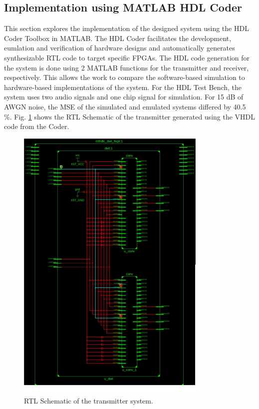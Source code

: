 \documentclass[conference]{IEEEtran}
\begin{document}
\subsection{Implementation using MATLAB HDL Coder}
This section explores the implementation of the designed system using the HDL Coder Toolbox in MATLAB. The HDL Coder facilitates the development, eumlation and verification of hardware designs and automatically generates synthesizable RTL code to target specific FPGAs. The HDL code generation for the system is done using 2 MATLAB functions for the transmitter and receiver, respectively. This allows the work to compare the software-based simulation to hardware-based implementations of the system. For the HDL Test Bench, the system uses two audio signals and one chip signal for simulation. For 15 dB of AWGN noise, the MSE of the simulated and emulated systems differed by 40.5 \%. Fig. \ref{fig:rtl} shows the RTL Schematic of the transmitter generated using the VHDL code from the Coder. 

\begin{figure}[htpb]
    \centering
    \includegraphics[width = 9.1cm]{rtl_schematic.png}
    \caption{RTL Schematic of the transmitter system.}
    \label{fig:rtl}
\end{figure}
\end{document}
